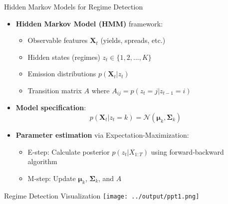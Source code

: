\documentclass{beamer}
\begin{document}
\begin{frame}{Hidden Markov Models for Regime Detection}
\begin{itemize}
    \item \textbf{Hidden Markov Model (HMM)} framework:
    \begin{itemize}
        \item Observable features $\mathbf{X}_t$ (yields, spreads, etc.)
        \item Hidden states (regimes) $z_t \in \{1,2,...,K\}$
        \item Emission distributions $p(\mathbf{X}_t|z_t)$
        \item Transition matrix $A$ where $A_{ij} = p(z_t=j|z_{t-1}=i)$
    \end{itemize}
    \item \textbf{Model specification}:
    \begin{equation}
    p(\mathbf{X}_t|z_t=k) = \mathcal{N}(\boldsymbol{\mu}_k, \boldsymbol{\Sigma}_k)
    \end{equation}
    \item \textbf{Parameter estimation} via Expectation-Maximization:
    \begin{itemize}
        \item E-step: Calculate posterior $p(z_t|X_{1:T})$ using forward-backward algorithm
        \item M-step: Update $\boldsymbol{\mu}_k$, $\boldsymbol{\Sigma}_k$, and $A$
    \end{itemize}
\end{itemize}
\end{frame}


\begin{frame}{Regime Detection Visualization}
    \centering
    \texttt{[image: ../output/ppt1.png]}
\end{frame}
\end{document}
